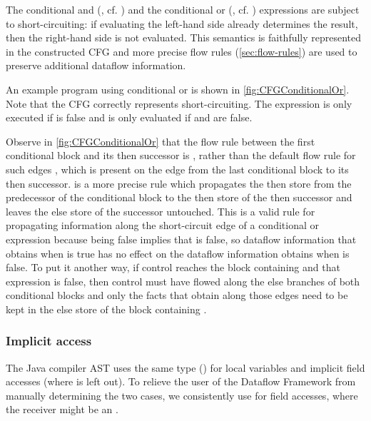 The conditional and (\code{&&}, cf. ) and the
conditional or (\code{||}, cf. ) expressions are subject
to short-circuiting: if evaluating the left-hand side already
determines the result, then the right-hand side is not evaluated. This
semantics is faithfully represented in the constructed CFG and more
precise flow rules (\autoref{sec:flow-rules}) are used to preserve
additional dataflow information.

An example program using conditional or is shown in
\autoref{fig:CFGConditionalOr}.  Note that the CFG correctly
represents short-circuiting.  The expression  is only
executed if  is false and  is only evaluated if
 and  are false.

Observe in \autoref{fig:CFGConditionalOr} that the flow rule between
the first conditional block and its then successor is
, rather than the default flow rule for such edges
, which is present on the edge from the last
conditional block to its then successor.   is a
more precise rule which propagates the then store from the predecessor
of the conditional block to the then store of the then successor and
leaves the else store of the successor untouched.  This is a valid
rule for propagating information along the short-circuit edge of a
conditional or expression because  being false
implies that  is false, so dataflow information that obtains
when  is true has no effect on the dataflow information
obtains when  is false.  To put it another way,
if control reaches the block containing  and
that expression is false, then control must have flowed along the else
branches of both conditional blocks and only the facts that obtain
along those edges need to be kept in the else store of the block
containing .



\subsubsection{Implicit  access}

The Java compiler AST uses the same type () for
local variables and implicit field accesses (where  is
left out).  To relieve the user of the Dataflow Framework from
manually determining the two cases, we consistently use
 for field accesses, where the receiver might be
an .


